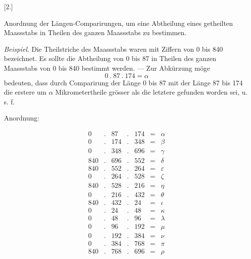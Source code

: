 \begin{center}[2.]\end{center}
Anordnung der Längen-Comparirungen, um eine Abtheilung eines getheilten Maassstabs in Theilen des ganzen Maassstabs zu bestimmen.

\textit{Beispiel.} Die Theilstriche des Maassstabs waren mit Ziffern von 0 bis 840 bezeichnet. Es sollte die Abtheilung von 0 bis 87 in Theilen des ganzen Maassstabs von 0 bis 840 bestimmt werden. — Zur Abkürzung möge
\[
0\ .\ 87\ .\ 174=\alpha
\]
bedeuten, dass durch Comparirung der Länge 0 bis 87 mit der Länge 87 bis 174 die erstere um $\alpha$ Mikrometertheile grösser als die letztere gefunden worden sei, u. s. f.
\begin{center}Anordnung:\end{center}
\[
\begin{array}{rcrcrcl}
0&.&87&.&174&=&\alpha\\
0&.&174&.&348&=&\beta\\
0&.&348&.&696&=&\gamma\\
840&.&696&.&552&=&\delta\\
840&.&552&.&264&=&\varepsilon\\
0&.&264&.&528&=&\zeta\\
840&.&528&.&216&=&\eta\\
0&.&216&.&432&=&\theta\\
840&.&432&.&24&=&\iota\\
0&.&24&.&48&=&\kappa\\
0&.&48&.&96&=&\lambda\\
0&.&96&.&192&=&\mu\\
0&.&192&.&384&=&\nu\\
0&.&384&.&768&=&\pi\\
840&.&768&.&696&=&\rho
\end{array}
\]

